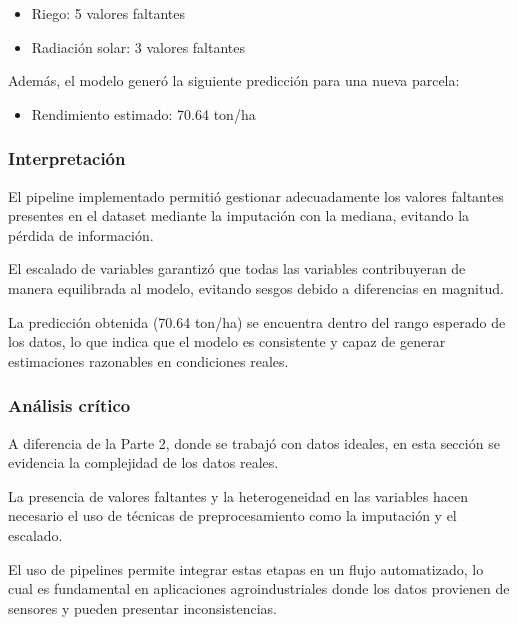 \begin{itemize}
    \item Riego: 5 valores faltantes
    \item Radiación solar: 3 valores faltantes
\end{itemize}

Además, el modelo generó la siguiente predicción para una nueva parcela:

\begin{itemize}
    \item Rendimiento estimado: 70.64 ton/ha
\end{itemize}

\subsubsection{Interpretación}

El pipeline implementado permitió gestionar adecuadamente los valores faltantes presentes en el dataset mediante la imputación con la mediana, evitando la pérdida de información.

El escalado de variables garantizó que todas las variables contribuyeran de manera equilibrada al modelo, evitando sesgos debido a diferencias en magnitud.

La predicción obtenida (70.64 ton/ha) se encuentra dentro del rango esperado de los datos, lo que indica que el modelo es consistente y capaz de generar estimaciones razonables en condiciones reales.

\subsubsection{Análisis crítico}

A diferencia de la Parte 2, donde se trabajó con datos ideales, en esta sección se evidencia la complejidad de los datos reales.

La presencia de valores faltantes y la heterogeneidad en las variables hacen necesario el uso de técnicas de preprocesamiento como la imputación y el escalado.

El uso de pipelines permite integrar estas etapas en un flujo automatizado, lo cual es fundamental en aplicaciones agroindustriales donde los datos provienen de sensores y pueden presentar inconsistencias.